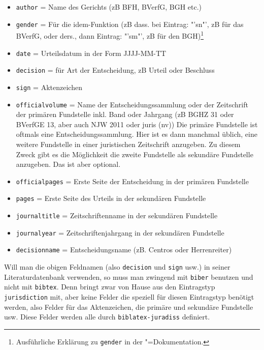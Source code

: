 \begin{itemize}

\item \texttt{author} = Name des Gerichts (zB BFH, BVerfG, BGH etc.)
\item \texttt{gender} = Für die idem-Funktion (zB dass. bei Eintrag: "'sn"', zB für das BVerfG, oder 
ders., dann Eintrag: "'sm"', zB für den BGH)\footnote{Ausführliche Erklärung zu \texttt{gender} in der 
\bib"=Dokumentation.}
\item \texttt{date} = Urteilsdatum in der Form JJJJ-MM-TT
\item \texttt{decision} = für Art der Entscheidung, zB Urteil oder Beschluss
\item \texttt{sign} = Aktenzeichen
\item \texttt{officialvolume} = Name der Entscheidungssammlung oder der Zeitschrift der primären 
Fundstelle inkl. Band oder Jahrgang (zB BGHZ 31 oder BVerfGE 13, aber auch NJW 2011 oder juris 
(nv)) Die primäre Fundstelle ist oftmals eine Entscheidungssammlung. Hier ist es dann manchmal 
üblich, eine weitere Fundstelle in einer juristischen Zeitschrift anzugeben. Zu diesem Zweck gibt es 
die Möglichkeit die zweite Fundstelle als sekundäre Fundstelle anzugeben. Das ist aber optional. 
\item \texttt{officialpages} = Erste Seite der Entscheidung in der primären Fundstelle
\item \texttt{pages} = Erste Seite des Urteils in der sekundären Fundstelle 
\item \texttt{journaltitle} = Zeitschriftenname in der sekundären Fundstelle
\item \texttt{journalyear} = Zeitschriftenjahrgang in der sekundären Fundstelle
\item \texttt{decisionname} = Entscheidungsname (zB. Centros oder Herrenreiter)
\end{itemize}

Will man die obigen Feldnamen (also \texttt{decision} und \texttt{sign} usw.) in seiner 
Literaturdatenbank verwenden, 
so muss man \bib zwingend mit \texttt{biber} benutzen und nicht mit \texttt{bibtex}. Denn \bib 
bringt zwar von 
Hause aus den Eintragstyp \texttt{jurisdiction} mit, aber keine Felder die speziell für diesen 
Eintragstyp 
benötigt werden, also Felder für das Aktenzeichen, die primäre und sekundäre Fundstelle usw. 
Diese Felder werden alle durch \texttt{biblatex-juradiss} definiert.

